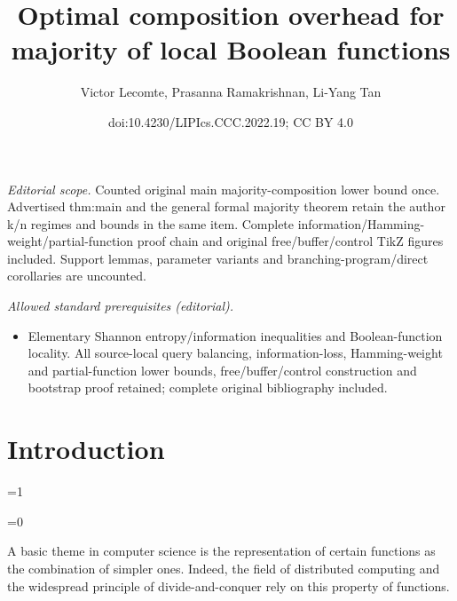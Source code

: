 \documentclass[10pt,a4paper]{article}
\title{Optimal composition overhead for majority of local Boolean functions}
\author{Victor Lecomte, Prasanna Ramakrishnan, Li-Yang Tan}
\date{doi:10.4230/LIPIcs.CCC.2022.19; CC BY 4.0}
\theoremstyle{definition}
\theoremstyle{remark}
\begin{document}
\maketitle
\noindent\textit{Editorial scope.} Counted original main majority-composition lower bound once. Advertised thm:main and the general formal majority theorem retain the author k/n regimes and bounds in the same item. Complete information/Hamming-weight/partial-function proof chain and original free/buffer/control TikZ figures included. Support lemmas, parameter variants and branching-program/direct corollaries are uncounted.\par\medskip
\noindent\textit{Allowed standard prerequisites (editorial).}\begin{itemize}
\item Elementary Shannon entropy/information inequalities and Boolean-function locality. All source-local query balancing, information-loss, Hamming-weight and partial-function lower bounds, free/buffer/control construction and bootstrap proof retained; complete original bibliography included.
\end{itemize}\medskip
\section{Introduction}


\def\colorful{0}


\ifnum\colorful=1
\newcommand{\violet}[1]{{\color{violet}{#1}}}
\newcommand{\orange}[1]{{\color{orange}{#1}}}
\newcommand{\blue}[1]{{{\color{blue}#1}}}
\newcommand{\red}[1]{{\color{red} {#1}}}
\newcommand{\green}[1]{{\color{green} {#1}}}
\newcommand{\pink}[1]{{\color{pink}{#1}}}
\newcommand{\gray}[1]{{\color{gray}{#1}}}

\fi
\ifnum\colorful=0
\newcommand{\violet}[1]{{{#1}}}
\newcommand{\orange}[1]{{{#1}}}
\newcommand{\blue}[1]{{{#1}}}
\newcommand{\red}[1]{{{#1}}}
\newcommand{\green}[1]{{{#1}}}
\newcommand{\gray}[1]{{{#1}}}

\fi


\def\showgray{0}


\renewcommand{\gray}[1]{\vspace{2\baselineskip}}



A basic theme in computer science is the representation of certain functions as the combination of simpler ones.
Indeed, the field of distributed computing and the widespread principle of divide-and-conquer rely on this property of functions.
\end{document}
